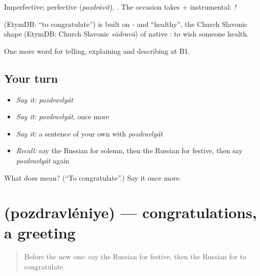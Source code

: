 Imperfective; perfective \emph{} (\emph{pozdrávit}), \emph{}. The occasion takes \emph{} + instrumental: \emph{ !}

\begin{cousinweb}
\emph{} (EtymDB: \textquotedblleft{}to congratulate\textquotedblright{}) is built on \emph{-} and \emph{} \textquotedblleft{}healthy\textquotedblright{}, the Church Slavonic shape (EtymDB: Church Slavonic \emph{sŭdravŭ}) of native \emph{}: to wish someone health.
\end{cousinweb}

\begin{grammarlens}[title={What you've built}]
One more word for telling, explaining and describing at B1.
\end{grammarlens}

\subsection*{Your turn}
\begin{itemize}
\raggedright
  \item \emph{Say it:} \emph{pozdravlyát}
  \item \emph{Say it:} \emph{pozdravlyát}, once more
  \item \emph{Say it:} a sentence of your own with \emph{pozdravlyát}
  \item \emph{Recall:} say the Russian for solemn, then the Russian for festive, then say \emph{pozdravlyát} again
\end{itemize}

\begin{tcolorbox}[breakable,colback=teal!4,colframe=teal!35!black,title={Before you move on}]
What does  mean? (\textquotedblleft{}To congratulate\textquotedblright{}.) Say it once more.
\end{tcolorbox}
\section[\texorpdfstring{\ru{поздравление} (pozdravléniye)}{поздравление (pozdravléniye)}]{ (pozdravléniye) — congratulations, a greeting}

\label{lesson:RU-C312-pozdravleniye}



\begin{quote}
Before the new one: say the Russian for festive, then the Russian for to congratulate.
\end{quote}

